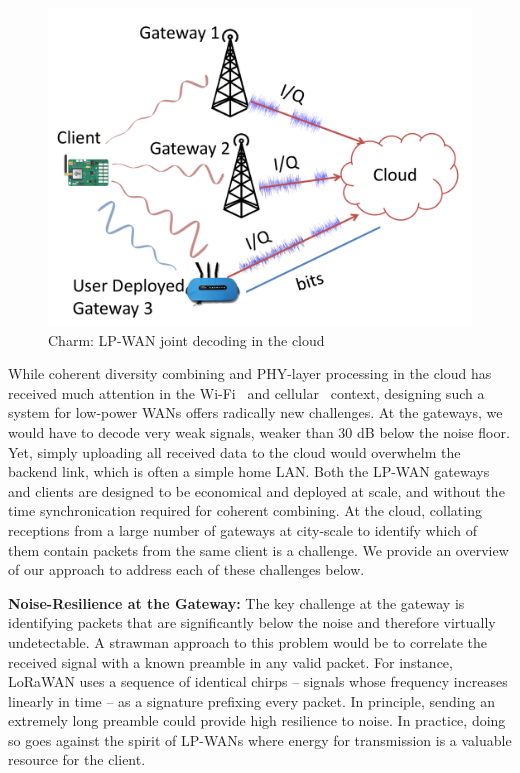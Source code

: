 \begin{figure}
    \centering
    \includegraphics[width=0.60\columnwidth]{figures/LoRaRAN.pdf}
        \vspace*{-0.1in}
    \caption{Charm: LP-WAN joint decoding in the cloud}
    \vspace*{-0.1in}
    \label{fig:my_label}
    \compactimg
\end{figure}

While coherent diversity combining and PHY-layer processing in the cloud has
received much attention in the Wi-Fi~\cite{tan2009sam, xie2014scalable} and
cellular~\cite{checko2015cloud, wubben2014benefits} context, designing such a
system for low-power WANs offers radically new challenges. At the gateways, we
would have to decode very weak signals, weaker than 30 dB below the noise
floor. Yet, simply uploading all received data to the cloud would overwhelm
the backend link, which is often  a simple home LAN. Both the LP-WAN gateways
and clients are designed to be economical and deployed at scale, and without
the time synchronication required for coherent combining. At the cloud,
collating receptions from a large number of gateways at city-scale to identify
which of them contain packets from the same client is a challenge. We provide
an overview of our approach to address each of these challenges below.

\noindent \textbf{Noise-Resilience at the Gateway:} The key challenge at the
gateway is identifying packets that are significantly below the noise and
therefore virtually undetectable. A strawman approach to this problem would be
to correlate the received signal with a known preamble in any valid packet.
For instance, LoRaWAN uses a sequence of identical chirps -- signals whose
frequency increases linearly in time -- as a signature prefixing every packet.
In principle, sending an extremely long preamble could provide high resilience
to noise. In practice, doing so goes against the spirit of LP-WANs where
energy for transmission is a valuable resource for the client.


